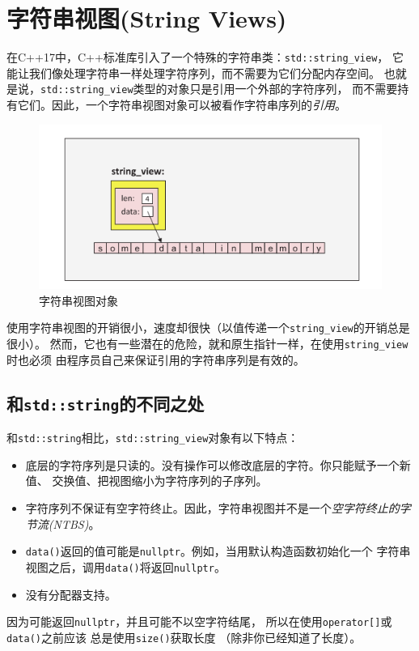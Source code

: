 \chapter[字符串视图]{字符串视图(String Views)}\label{ch19}
在C++17中，C++标准库引入了一个特殊的字符串类：\texttt{std::string\_view}，
它能让我们像处理字符串一样处理字符序列，而不需要为它们分配内存空间。
也就是说，\texttt{std::string\_view}类型的对象只是引用一个外部的字符序列，
而不需要持有它们。因此，一个字符串视图对象可以被看作字符串序列的\emph{引用}。

\begin{figure}[htb]
    \begin{center}
        \includegraphics[scale=0.8]{../imgs/19.1.png}
        \caption{字符串视图对象}
        \label{f19.1}
    \end{center}
\end{figure}

使用字符串视图的开销很小，速度却很快（以值传递一个\texttt{string\_view}的开销总是很小）。
然而，它也有一些潜在的危险，就和原生指针一样，在使用\texttt{string\_view}时也必须
由程序员自己来保证引用的字符串序列是有效的。


\section{和\texttt{std::string}的不同之处}
和\texttt{std::string}相比，\texttt{std::string\_view}对象有以下特点：
\begin{itemize}
    \item 底层的字符序列是只读的。没有操作可以修改底层的字符。你只能赋予一个新值、
    交换值、把视图缩小为字符序列的子序列。
    \item 字符序列不保证有空字符终止。因此，字符串视图并不是一个\emph{空字符终止的字节流(NTBS)}。
    \item \texttt{data()}返回的值可能是\texttt{nullptr}。例如，当用默认构造函数初始化一个
    字符串视图之后，调用\texttt{data()}将返回\texttt{nullptr}。
    \item 没有分配器支持。
\end{itemize}
因为可能返回\texttt{nullptr}，并且可能不以空字符结尾，
所以在使用\texttt{operator[]}或\texttt{data()}之前应该
总是使用\texttt{size()}获取长度
（除非你已经知道了长度）。


